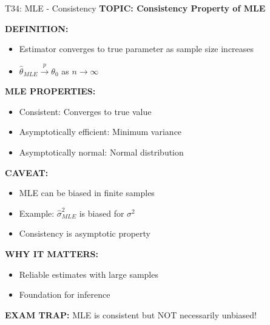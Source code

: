 \documentclass[8pt]{beamer}
\begin{document}
	\begin{frame}{T34: MLE - Consistency}
		\fontsize{6.5}{7.5}\selectfont
		\textbf{TOPIC: Consistency Property of MLE}
		
		\vspace{0.1cm}
		\textbf{DEFINITION:}
		\begin{itemize}
			\item Estimator converges to true parameter as sample size increases
			\item $\hat{\theta}_{MLE} \xrightarrow{p} \theta_0$ as $n \to \infty$
		\end{itemize}
		
		\vspace{0.1cm}
		\textbf{MLE PROPERTIES:}
		\begin{itemize}
			\item \textcolor{myblue}{Consistent:} Converges to true value
			\item \textcolor{myblue}{Asymptotically efficient:} Minimum variance
			\item \textcolor{myblue}{Asymptotically normal:} Normal distribution
		\end{itemize}
		
		\vspace{0.1cm}
		\textbf{CAVEAT:}
		\begin{itemize}
			\item MLE can be biased in finite samples
			\item Example: $\hat{\sigma}^2_{MLE}$ is biased for $\sigma^2$
			\item Consistency is asymptotic property
		\end{itemize}
		
		\vspace{0.1cm}
		\textbf{WHY IT MATTERS:}
		\begin{itemize}
			\item Reliable estimates with large samples
			\item Foundation for inference
		\end{itemize}
		
		\textcolor{myred}{\textbf{EXAM TRAP:}} MLE is \textcolor{myblue}{consistent} but NOT necessarily unbiased!
	\end{frame}
	
\end{document}
